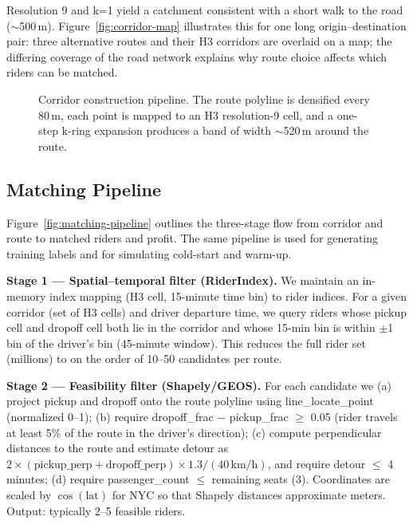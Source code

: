 \documentclass[11pt,a4paper]{article}
\begin{document}
Resolution 9 and k=1 yield a catchment consistent with a short walk to the road ($\sim$500\,m). Figure~\ref{fig:corridor-map} illustrates this for one long origin--destination pair: three alternative routes and their H3 corridors are overlaid on a map; the differing coverage of the road network explains why route choice affects which riders can be matched.

\begin{figure}[htbp]
\centering
{}
\caption{Corridor construction pipeline. The route polyline is densified every 80\,m, each point is mapped to an H3 resolution-9 cell, and a one-step k-ring expansion produces a band of width $\sim$520\,m around the route.}
\label{fig:corridor-pipeline}
\end{figure}

\subsection{Matching Pipeline}
\label{sec:matching}

Figure~\ref{fig:matching-pipeline} outlines the three-stage flow from corridor and route to matched riders and profit. The same pipeline is used for generating training labels and for simulating cold-start and warm-up.

\textbf{Stage 1 --- Spatial--temporal filter (RiderIndex).} We maintain an in-memory index mapping (H3 cell, 15-minute time bin) to rider indices. For a given corridor (set of H3 cells) and driver departure time, we query riders whose pickup cell and dropoff cell both lie in the corridor and whose 15-min bin is within $\pm$1 bin of the driver's bin (45-minute window). This reduces the full rider set (millions) to on the order of 10--50 candidates per route.

\textbf{Stage 2 --- Feasibility filter (Shapely/GEOS).} For each candidate we (a) project pickup and dropoff onto the route polyline using line\_locate\_point (normalized 0--1); (b) require dropoff\_frac $-$ pickup\_frac $\ge$ 0.05 (rider travels at least 5\% of the route in the driver's direction); (c) compute perpendicular distances to the route and estimate detour as $2 \times (\text{pickup\_perp} + \text{dropoff\_perp}) \times 1.3 / (40\,\text{km/h})$, and require detour $\le$ 4 minutes; (d) require passenger\_count $\le$ remaining seats (3). Coordinates are scaled by $\cos(\text{lat})$ for NYC so that Shapely distances approximate meters. Output: typically 2--5 feasible riders.
\end{document}
